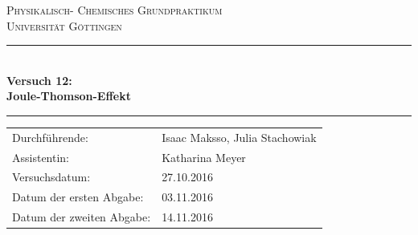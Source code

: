 \documentclass[a4paper,12pt,oneside,onecolum,final,openany]{report}
\begin{document}
\begin{titlepage}
\centering
\textsc{\Large Physikalisch- Chemisches Grundpraktikum\\[1.5ex] Universität Göttingen}

\vspace*{0.5cm}

\rule{\textwidth}{1pt}\\[0.5cm]
{\huge \bfseries
  Versuch 12: \\[1.5ex]
  Joule-Thomson-Effekt}\\[0.5cm]
\rule{\textwidth}{1pt}

\vspace*{0.5cm}


\begin{Large}
\begin{tabular}{ll}
Durchführende: &  Isaac Maksso, Julia Stachowiak\\
Assistentin: & Katharina Meyer \\
 Versuchsdatum: & 27.10.2016\\
 Datum der ersten Abgabe: & 03.11.2016\\
 Datum der zweiten Abgabe: & 14.11.2016\\
\end{tabular}
\end{Large}

\vspace*{0.5cm}

 

\end{titlepage}
\end{document}
